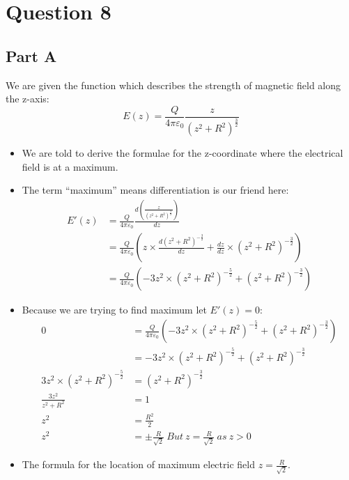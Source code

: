 \documentclass[10pt]{article}
\begin{document}
\pagebreak
\section{Question 8}
\subsection{Part A}
We are given the function which describes the strength of magnetic field along the z-axis:
\begin{displaymath}
E(z)=\frac{Q}{4 \pi \varepsilon_0}\frac{z}{(z^2+R^2)^{\frac{3}{2}}}
\end{displaymath}
\begin{itemize}
\item We are told to derive the formulae for the z-coordinate where the electrical field is at a maximum.
\item The term ``maximum'' means differentiation is our friend here:
\setcounter{equation}{0}
\begin{align*}
E'(z)&=\frac{Q}{4 \pi \varepsilon_0} \frac{ d \left(\frac{z}{(z^2+R^2)^{\frac{3}{2}}} \right) }{dz} \\
&=\frac{Q}{4 \pi \varepsilon_0} \left(z \times  \frac{d(z^2+R^2)^{-\frac{3}{2}}}{dz} + \frac{dz}{dz} \times (z^2+R^2)^{-\frac{3}{2}}\right) \\
&=\frac{Q}{4 \pi \varepsilon_0} \left(- 3 z^2 \times (z^2+R^2)^{-\frac{5}{2}} + (z^2+R^2)^{-\frac{3}{2}}\right)
\end{align*}

\item Because we are trying to find maximum let $E'(z)=0$:
\begin{align*}
0&=\frac{Q}{4 \pi \varepsilon_0} \left(- 3 z^2 \times (z^2+R^2)^{-\frac{5}{2}} + (z^2+R^2)^{-\frac{3}{2}}\right) \\
&=- 3 z^2 \times (z^2+R^2)^{-\frac{5}{2}} + (z^2+R^2)^{-\frac{3}{2}} \\
3 z^2 \times (z^2+R^2)^{-\frac{5}{2}} &= (z^2+R^2)^{-\frac{3}{2}} \\
\frac{3 z^2}{ z^2+R^2} &= 1 \\
z^2 &= \frac{R^2}{2} \\
z^2 &= \pm\frac{R}{\sqrt{2}} \ But \ z= \frac{R}{\sqrt{2}} \ as \ z > 0
\end{align*}
\item The formula for the location of maximum electric field $z= \frac{R}{\sqrt{2}}$.
\pagebreak

\end{itemize}
\end{document}
